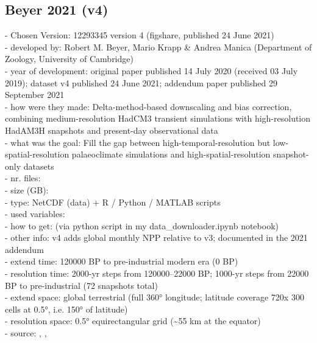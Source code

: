 \documentclass[12pt]{scrartcl}
\begin{document}
\subsection{Beyer 2021 (v4)}
- Chosen Version: 12293345 version 4 (figshare, published 24 June 2021)\\
- developed by: Robert M. Beyer, Mario Krapp \& Andrea Manica (Department of Zoology, University of Cambridge)\\
- year of development: original paper published 14 July 2020 (received 03 July 2019); dataset v4 published 24 June 2021; addendum paper published 29 September 2021\\
- how were they made: Delta-method-based downscaling and bias correction, combining medium-resolution HadCM3 transient simulations with high-resolution HadAM3H snapshots and present-day observational data\\
- what was the goal: Fill the gap between high-temporal-resolution but low-spatial-resolution palaeoclimate simulations and high-spatial-resolution snapshot-only datasets\\
- nr. files: \\
- size (GB): \\
- type: NetCDF (data) + R / Python / MATLAB scripts\\
- used variables: \\
- how to get: (via python script in my data\_downloader.ipynb notebook)\\
- other info: v4 adds global monthly NPP relative to v3; documented in the 2021 addendum\\
- extend time: 120000 BP to pre-industrial modern era (0 BP)\\
- resolution time: 2000-yr steps from 120000--22000 BP; 1000-yr steps from 22000 BP to pre-industrial (72 snapshots total)\\
- extend space: global terrestrial (full 360° longitude; latitude coverage 720x 300 cells at 0.5°, i.e. 150° of latitude)\\
- resolution space: 0.5° equirectangular grid (\textasciitilde55 km at the equator)\\
- source: \cite{beyer2020_paper}, \cite{beyer2021_addendum}, \cite{beyer2021_data_4}\\
\end{document}
